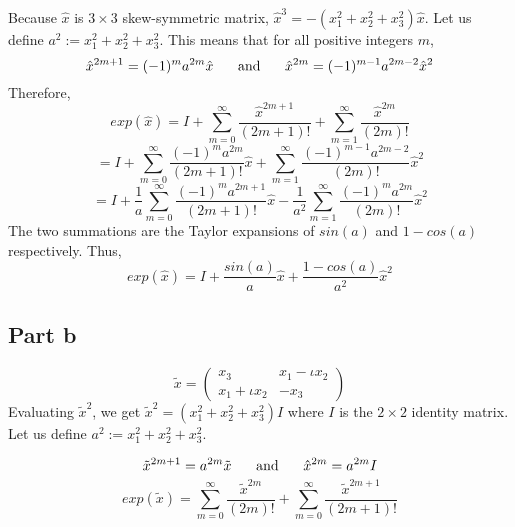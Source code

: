 \documentclass[11pt]{article}
\begin{document}
Because $\hat{x}$ is $3 \times 3$ skew-symmetric matrix, $\hat{x}^3 = -(x_1^2 + x_2^2 + x_3^2) \hat{x} $. Let us define $a^2 := x_1^2 + x_2^2 + x_3^2$. This means that for 
all positive integers $m$,
 $$\hat{x}^{2m+1} = (-1)^m a^{2m} \hat{x} \hspace{5mm}\text{ and } \hspace{5mm}
 \hat{x}^{2m} = (-1)^{m-1} a^{2m-2} \hat{x}^2
 $$
Therefore,
\begin{equation*}
    exp(\hat{x}) = I + \sum_{m = 0}^{\infty} \frac{\hat{x}^{2m+1}}{(2m+1)!} + \sum_{m = 1}^{\infty} \frac{\hat{x}^{2m}}{(2m)!}
\end{equation*}
\begin{equation*}
    = I + \sum_{m = 0}^{\infty} \frac{(-1)^m a^{2m}}{(2m+1)!}\hat{x} + \sum_{m = 1}^{\infty} \frac{(-1)^{m-1}a^{2m-2}}{(2m)!}\hat{x}^2
\end{equation*}
\begin{equation*}
    = I + \frac{1}{a}\sum_{m = 0}^{\infty} \frac{(-1)^m a^{2m+1}}{(2m+1)!}\hat{x} - \frac{1}{a^2}\sum_{m = 1}^{\infty} \frac{(-1)^{m}a^{2m}}{(2m)!}\hat{x}^2
\end{equation*} 
The two summations are the Taylor expansions of $sin(a)$ and $1 - cos(a)$ respectively. Thus,
\begin{equation*}
    exp(\hat{x}) = I + \frac{sin(a)}{a}\hat{x} + \frac{1 - cos(a)}{a^2}\hat{x}^2
\end{equation*}

\subsection*{Part b}
$$\tilde{x} = \begin{pmatrix}
    x_3 & x_1 - \iota x_2 \\
    x_1 + \iota x_2 & -x_3
\end{pmatrix}$$
Evaluating $\tilde{x}^2$, we get 
$\tilde{x}^2 = (x_1^2 + x_2^2 + x_3^2) I$ where $I$ is the $2 \times 2$ identity matrix. \\Let us define $a^2 := x_1^2 + x_2^2 + x_3^2$.

$$\tilde{x}^{2m+1} = a^{2m} \tilde{x} \hspace{5mm}\text{ and } \hspace{5mm}
\hat{x}^{2m} = a^{2m} I
$$
\begin{equation*}
    exp(\tilde{x}) = \sum_{m = 0}^{\infty} \frac{\tilde{x}^{2m}}{(2m)!} + \sum_{m = 0}^{\infty} \frac{\tilde{x}^{2m+1}}{(2m+1)!}
\end{equation*}
 
\end{document}
